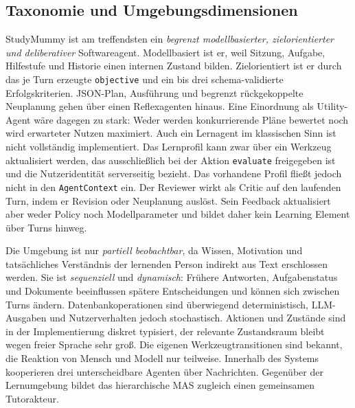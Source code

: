 \subsection{Taxonomie und Umgebungsdimensionen}

StudyMummy ist am treffendsten ein \emph{begrenzt modellbasierter,
zielorientierter und deliberativer} Softwareagent. Modellbasiert ist er, weil
Sitzung, Aufgabe, Hilfestufe und Historie einen internen Zustand bilden.
Zielorientiert ist er durch das je Turn erzeugte \texttt{objective} und ein bis
drei schema-validierte Erfolgskriterien. JSON-Plan, Ausführung und
begrenzt rückgekoppelte Neuplanung gehen über einen Reflexagenten hinaus. Eine Einordnung als Utility-Agent wäre dagegen zu
stark: Weder werden konkurrierende Pläne bewertet noch wird erwarteter Nutzen
maximiert. Auch ein Lernagent im klassischen Sinn ist nicht vollständig
implementiert. Das Lernprofil kann zwar über ein Werkzeug aktualisiert werden,
das ausschließlich bei der Aktion \texttt{evaluate} freigegeben ist und die
Nutzeridentität serverseitig bezieht. Das vorhandene Profil fließt jedoch nicht
in den \texttt{AgentContext} ein. Der Reviewer wirkt als Critic
auf den laufenden Turn, indem er Revision oder Neuplanung auslöst. Sein Feedback
aktualisiert aber weder Policy noch Modellparameter und bildet daher kein
Learning Element über Turns hinweg.

Die Umgebung ist nur \emph{partiell beobachtbar}, da Wissen, Motivation und
tatsächliches Verständnis der lernenden Person indirekt aus Text erschlossen
werden. Sie ist \emph{sequenziell} und \emph{dynamisch}: Frühere Antworten,
Aufgabenstatus und Dokumente beeinflussen spätere Entscheidungen und können
sich zwischen Turns ändern. Datenbankoperationen sind überwiegend
deterministisch, LLM-Ausgaben und Nutzerverhalten jedoch stochastisch. Aktionen
und Zustände sind in der Implementierung diskret typisiert, der relevante
Zustandsraum bleibt wegen freier Sprache sehr groß. Die eigenen
Werkzeugtransitionen sind bekannt, die Reaktion von Mensch und Modell nur
teilweise. Innerhalb des Systems kooperieren drei unterscheidbare Agenten über
Nachrichten. Gegenüber der Lernumgebung bildet das hierarchische MAS zugleich
einen gemeinsamen Tutorakteur.

